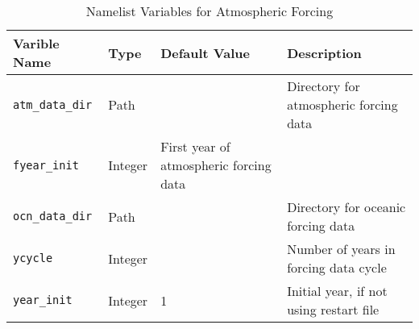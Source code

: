 \begin{table}
  \begin{center}
  \caption{Namelist Variables for Atmospheric Forcing}
  \label{table:nml_atm_for}
  \begin{tabular}{p{4cm}p{2.0cm}p{3cm}p{5.5cm}} \hline
  Varible Name & Type & Default Value & Description               \\

  \hline \hline

{\tt atm\_data\_dir} &  Path  &   &  Directory for atmospheric forcing data \\

{\tt fyear\_init} &  Integer &  First year of atmospheric forcing data \\

{\tt ocn\_data\_dir} &  Path &   &  Directory for oceanic forcing data \\

{\tt ycycle} &  Integer &   &  Number of years in forcing data cycle \\

{\tt year\_init} &  Integer & 1  &  Initial year, if not using restart file \\

  \hline
  \end{tabular}
  \end{center}
\end{table}

